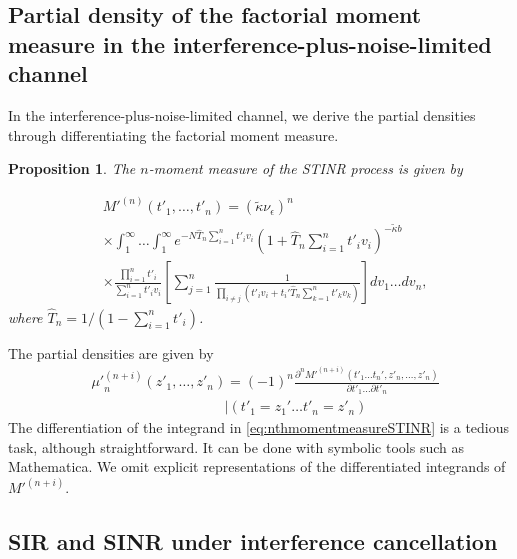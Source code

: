\documentclass[lettersize,journal]{IEEEtran}
\newtheorem{prop}[theorem]{Proposition}
\begin{document}
\subsection{Partial density of the factorial moment measure in the interference-plus-noise-limited channel}


In the interference-plus-noise-limited channel, we derive the partial densities through differentiating the factorial moment measure.

\begin{prop}
  The $n$-moment measure of the STINR process is given by

  \begin{align}
    \label{eq:nthmomentmeasureSTINR}
      &M'^{(n)}(t'_1,\dots,t'_n) =\left(\tilde{\kappa} \nu_{\epsilon}\right)^n \nonumber\\
      &\times \int_1^{\infty}\dots\int_1^{\infty} e^{-N\hat{T}_n\sum\limits_{i=1}^nt'_iv_i} \left(1+\hat{T}_n\sum\limits_{i=1}^nt'_iv_i\right)^{-\tilde{\kappa}b} \nonumber\\
      &\times \frac{\prod\limits_{i=1}^nt'_i}{\sum\limits_{i=1}^nt'_iv_i}  \left[\sum\limits_{j=1}^n\frac{1}{\prod\limits_{i\neq j}\left(t'_i v_i+ t_i'\hat{T}_n\sum\limits_{k=1}^nt'_kv_k \right)} \right] dv_1 \dots dv_n,
    \end{align}
    where $\hat{T}_n= 1/(1-\sum_{i=1}^nt'_i)$.


\end{prop}
 
The partial densities are given by
    \begin{align}
      \label{eq:differatemomentmeasure}
     &{\mu'}_n^{(n+i)}(z'_1,\dots,z'_n)= (-1)^n \frac{\partial^n M'^{(n+i)}(t'_1\dots t_n', z'_n, \dots, z'_n)}{\partial t'_1 \dots \partial t'_n} \nonumber\\
      &\hspace{4cm}|(t'_1=z_1'\dots t'_n=z'_n)
    \end{align}
The differentiation of the integrand in \eqref{eq:nthmomentmeasureSTINR} is a tedious task, although straightforward. It can be done with symbolic tools such as Mathematica. We omit explicit representations of the differentiated integrands of $M'^{(n+i)}$.



\subsection{SIR and SINR under interference cancellation}
\end{document}
